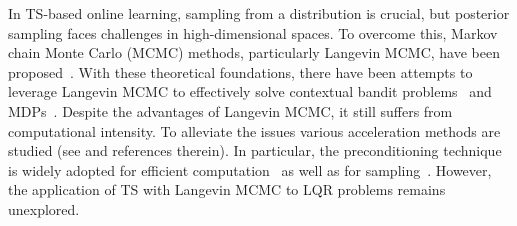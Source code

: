 \documentclass[11pt]{article}
\theoremstyle{plain}
\theoremstyle{definition}
\theoremstyle{remark}
\begin{document}
In TS-based online learning, sampling from a distribution is crucial, but posterior sampling faces challenges in high-dimensional spaces. To overcome this, Markov chain Monte Carlo (MCMC)  methods, particularly Langevin MCMC, have been proposed~\cite{gilks1995markov,roberts1996exponential,durmus2016sampling,welling2011bayesian}. With these theoretical foundations, there have been attempts to leverage Langevin MCMC to effectively solve contextual bandit problems~\cite{huix2023tight,xu2022langevin,mazumdar2020thompson} and MDPs~\cite{ishfaq2023provable,karbasi2023langevin}. 
Despite the advantages of Langevin MCMC, it still suffers from computational intensity. To alleviate the issues various acceleration methods are studied (see \cite{welling2011bayesian, li2019stochastic, mou2019high, ding2021random,lu2019accelerating} and references therein).
In particular, the preconditioning technique is widely adopted for efficient computation~\cite{zhou2023single} as well as for sampling~\cite{welling2011bayesian, girolami2011riemann, dalalyan2017theoretical,dwivedi2018log,russo2017tutorial}. However, the  application of  TS with Langevin MCMC to 
   LQR problems remains unexplored. 
\end{document}
